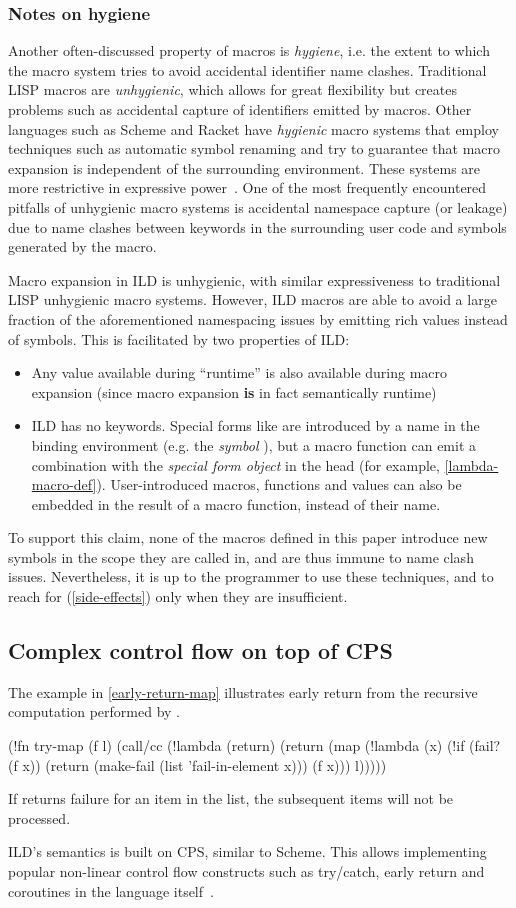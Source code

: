 \subsubsection{Notes on hygiene}
\label{hygiene-discussion}
Another often-discussed property of macros is \emph{hygiene}, i.e. the extent
to which the macro system tries to avoid accidental identifier name clashes.
Traditional LISP macros are \emph{unhygienic}, which allows for great
flexibility but creates problems such as accidental capture of identifiers
emitted by macros. Other languages such as Scheme and Racket have
\emph{hygienic} macro systems that employ techniques such as automatic symbol
renaming and try to guarantee that macro expansion is independent of the
surrounding environment. These systems are more restrictive in expressive
power~\cite{r5rs,racket}. One of the most frequently encountered pitfalls of
unhygienic macro systems is accidental namespace capture (or leakage) due to
name clashes between keywords in the surrounding user code and symbols
generated by the macro.%
~\cite{kohlbecker1986syntactic,clinger-explicit-renaming}

Macro expansion in ILD is unhygienic, with similar expressiveness
to traditional LISP unhygienic macro systems. However, ILD macros
are able to avoid a large fraction of the aforementioned namespacing issues by
emitting rich values instead of symbols. This is facilitated by two
properties of ILD:
\begin{itemize}
\item Any value available during ``runtime'' is also available during macro expansion (since
macro expansion \textbf{is} in fact semantically runtime)
\item ILD has no keywords. Special forms like  are introduced by a name in
the binding environment (e.g. the \emph{symbol} ), but a macro function can emit a combination
with the \emph{special form object}  in the head (for example, \cref{lambda-macro-def}). User-introduced
macros, functions and values can also be embedded in the result of a macro function,
instead of their name.
\end{itemize}
To support this claim, none of the macros defined in this paper introduce new
symbols in the scope they are called in, and are thus immune to name clash issues.
Nevertheless, it is up to the programmer to use these techniques, and to reach
for  (\cref{side-effects}) only when they are insufficient.
\subsection{Complex control flow on top of CPS}
The example in \cref{early-return-map} illustrates early return from the
recursive computation
performed by .
\begin{ildcode}
(!fn try-map (f l)
  (call/cc (!lambda (return)
    (return (map
      (!lambda (x)
        (!if (fail? (f x))
          (return
            (make-fail
            (list 'fail-in-element x)))
          (f x))) l)))))
\end{ildcode}
\label{early-return-map}
If  returns failure for an item in the list, the subsequent items will not
be processed.

ILD's semantics is built on CPS, similar to Scheme. This allows implementing
popular non-linear control flow constructs such as try/catch, early return
and coroutines in the language itself~\cite{r5rs}.
